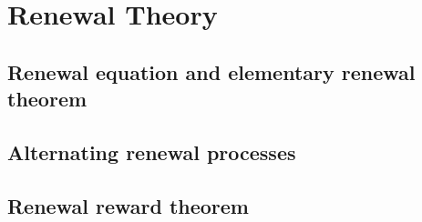 
\section{Renewal Theory}

\subsection{Renewal equation and elementary renewal theorem}


\subsection{Alternating renewal processes}


\subsection{Renewal reward theorem}

